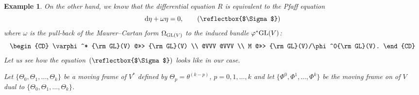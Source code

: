 \documentclass[pdftex]{sigma}%
\newcommand{\cR}{R}
\DeclareRobustCommand{\amgiS}{\text{\reflectbox{$\Sigma$}}}
\newtheorem{ex}[thm]{Example}
\numberwithin{equation}{section}
\begin{document}
\begin{ex}
On the other hand, we know that the differential equation $\cR$ is equivalent to the Pfaff equation
\[
{\rm d}\eta +\omega\eta = 0,\tag{\amgiS}
\]
where $\omega$ is the pull-back of the Maurer--Cartan form $\Omega_{{\rm GL}(V)}$ to the induced bundle $\varphi^*{\rm GL}(V)$:
\[
\begin{CD}
	\varphi^* {\rm GL}(V) @>>> {\rm GL}(V) \\
	@VVV @VVV \\
	M @>>> {\rm GL}(V)/\phi^0{\rm GL}(V).
\end{CD}
\]
Let us see how the equation~$(\amgiS)$ looks like in our case.

Let $\{\Theta_0,\Theta_1,\dots,\Theta_k\}$ be a moving frame of $V^*$ defined by $\Theta_p=\theta^{(k-p)}$, $p=0,1,\dots,k$ and let $\big\{\Phi^0,\Phi^1,\dots,\Phi^k\big\}$ be the moving frame on of $V$ dual to $\{\Theta_0,\Theta_1,\dots,\Theta_k\}$.


\end{ex}
\end{document}

